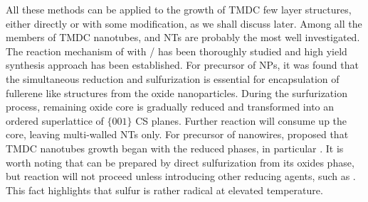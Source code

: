 All these methods can be applied to the growth of TMDC few layer structures, either directly or with some modification, as we shall discuss later. Among all the members of TMDC nanotubes,  and  NTs are probably the most well investigated.\cite{Homyonfer1997,Tenne1998,Frey1998,Frey1999,Rothschild2000,Zak2000} The reaction mechanism of  with / has been thoroughly studied \cite{Feldman1998} and high yield synthesis approach has been established.\cite{Margolin2004} For precursor of  NPs, it was found that the simultaneous reduction and sulfurization is essential for encapsulation of fullerene like  structures from the oxide nanoparticles. During the surfurization process, remaining oxide core is gradually reduced and transformed into an ordered superlattice of $\{ 001 \}$ CS planes. Further reaction will consume up the  core, leaving multi-walled  NTs only. For precursor of  nanowires, \citeauthor{Feldman1996} proposed that TMDC nanotubes growth began with the reduced  phases, in particular .\cite{Feldman1996} It is worth noting that  can be prepared by direct sulfurization from its oxides phase, but reaction  will not proceed unless introducing other reducing agents, such as .\cite{Tsirlina1998} This fact highlights that sulfur is rather radical at elevated temperature.

